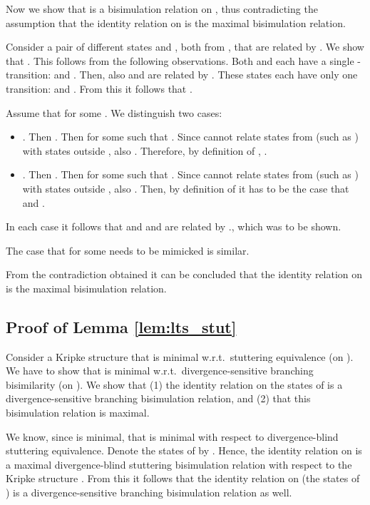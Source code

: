 \documentclass{llncs}
\begin{document}
Now we show that  is a bisimulation relation on \KS, thus contradicting the assumption that the identity relation on  is the maximal bisimulation relation.

Consider a pair of different states  and , both from , that are related by . We show that .
 This follows from the following observations. Both  and  each have a single -transition:  and . Then, also  and  are related by . These states each have only one transition:  and . From this it follows that .

 Assume that  for some . We distinguish two cases:
 \begin{itemize}
 \item . Then . Then  for some  such that . Since  cannot relate states from  (such as ) with states outside , also . Therefore, by definition of , .
 \item  . Then . Then  for some  such that . Since  cannot relate states from  (such as ) with states outside , also . Then, by definition of  it has to be the case that  and .
 \end{itemize}
 In each case it follows that  and  and  are related by ., which was to be shown.

The case that  for some  needs to be mimicked is similar.

From the contradiction obtained it can be concluded that the identity relation on  is the maximal bisimulation relation.


\subsection{Proof of Lemma \ref{lem:lts_stut}}
\label{pf:lem:lts_stut}

Consider a Kripke structure  that is minimal w.r.t.\ stuttering equivalence (on \KS). We have to show that  is minimal w.r.t.\ divergence-sensitive branching bisimilarity (on \LTS). We show that (1) the identity relation on the states of  is a divergence-sensitive branching bisimulation relation, and (2) that this bisimulation relation is maximal.

We know, since  is minimal, that  is minimal with respect to
divergence-blind stuttering equivalence. Denote the states of  by
. Hence, the identity relation on  is a
maximal divergence-blind stuttering bisimulation relation with respect
to the Kripke structure . From this it follows that the identity
relation on  (the states of ) is a divergence-sensitive
branching bisimulation relation as well.
\end{document}
